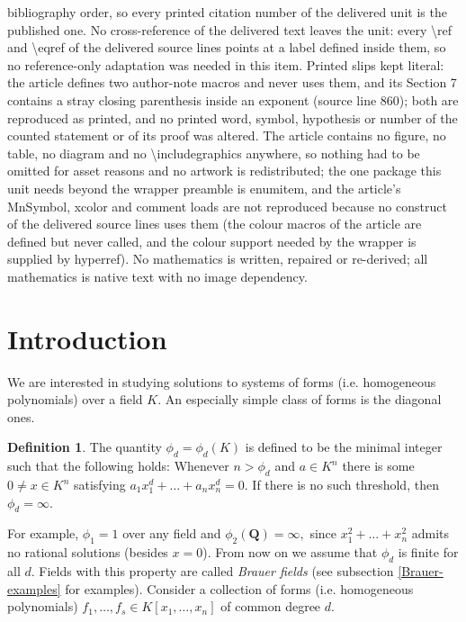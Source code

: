 \documentclass[10pt,a4paper]{amsart}
\theoremstyle{definition}
\newtheorem{definition}[theorem]{Definition}
\newcommand{\Q}{\mathbf{Q}}
\begin{document}
bibliography order, so every printed citation number of the delivered unit is the published one. No cross-reference of the delivered text leaves the unit: every \textbackslash{}ref and \textbackslash{}eqref of the delivered source lines points at a label defined inside them, so no reference-only adaptation was needed in this item. Printed slips kept literal: the article defines two author-note macros and never uses them, and its Section 7 contains a stray closing parenthesis inside an exponent (source line 860); both are reproduced as printed, and no printed word, symbol, hypothesis or number of the counted statement or of its proof was altered. The article contains no figure, no table, no diagram and no \textbackslash{}includegraphics anywhere, so nothing had to be omitted for asset reasons and no artwork is redistributed; the one package this unit needs beyond the wrapper preamble is enumitem, and the article's MnSymbol, xcolor and comment loads are not reproduced because no construct of the delivered source lines uses them (the colour macros of the article are defined but never called, and the colour support needed by the wrapper is supplied by hyperref). No mathematics is written, repaired or re-derived; all mathematics is native text with no image dependency.
\section{Introduction}

We are interested in studying solutions to systems of forms (i.e. homogeneous polynomials) over a field $K.$ An especially simple class of forms is the diagonal ones. 

\begin{definition}
    The quantity  $\phi_d = \phi_d(K)$ is defined to be the minimal integer such that the following holds: Whenever $n > \phi_d$ and $a\in K^n$ there is some $0\neq x\in K^n$ satisfying $a_1x_1^d+\ldots+a_nx_n^d = 0.$ If there is no such threshold, then $\phi_d = \infty.$ 
\end{definition}

For example, $\phi_1 =1$ over any field and $\phi_2(\Q) = \infty,$ since $x_1^2+\ldots+x_n^2$ admits no rational solutions (besides $x = 0$). From now on we assume that $\phi_d$ is finite for all $d.$ Fields with this property are called \emph{Brauer fields} (see subsection \ref{Brauer-examples} for examples). Consider a collection of forms (i.e. homogeneous polynomials) $ f_1,\ldots,f_s \in K[x_1,\ldots,x_n]$ of common degree $d.$ 
\end{document}
